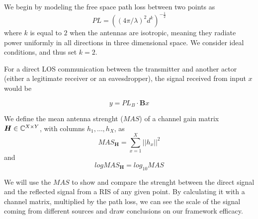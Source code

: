 We begin by modeling the free space path loss \cite{Free_space_path_loss} between two points as
\begin{equation}
  PL = ((4 \pi / \lambda)^2 d^k)^{-\frac{1}{2}}
\end{equation}
where $k$ is equal to $2$ when the antennas are isotropic, meaning they radiate power uniformly in all directions in three dimensional space. We consider ideal conditions, and thus set $k = 2$.

For a direct LOS communication between the transmitter and another actor (either a legitimate receiver or an eavesdropper), the signal received from input $x$ would be

\begin{equation}
  y = PL_B \cdot \bm{B}x
\end{equation}

We define the mean antenna strenght ($MAS$) of a channel gain matrix $\bm{H} \in \mathbb{C}^{X \times Y}$, with columns $h_1, \ldots, h_X$, as
\begin{equation}
  MAS_{\bm{H}} = \sum_{x=1}^{X} || h_x ||^2
\end{equation}
and
\begin{equation}
  logMAS_{\bm{H}} = log_{10} MAS
\end{equation}

We will use the $MAS$ to show and compare the strenght between the direct signal and the reflected signal from a RIS of any given point. By calculating it with a channel matrix, multiplied by the path loss, we can see the scale of the signal coming from different sources and draw conclusions on our framework efficacy.

